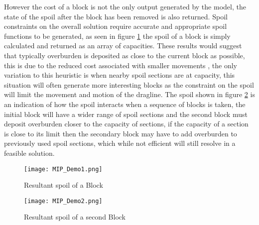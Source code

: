 However the cost of a block is not the only output generated by the model, the state of the spoil after the block has been removed is also returned. Spoil constraints on the overall solution require accurate and appropriate spoil functions to be generated, as seen in figure \ref{MIPDemo1} the spoil of a block is simply calculated and returned as an array of capacities. These results would suggest that typically overburden is deposited as close to the current block as possible, this is due to the reduced cost associated with smaller movements , the only variation to this heuristic is when nearby spoil sections are at capacity, this situation will often generate more interesting blocks  as the constraint on the spoil will limit the movement and motion of the dragline. The spoil shown in figure \ref{MIPDemo2} is an indication of how the spoil interacts when a sequence of blocks is taken, the initial block will have a wider range of spoil sections and the second block must deposit overburden closer to the capacity of sections, if the capacity of a section is close to its limit then the secondary block may have to add overburden to previously used spoil sections, which while not efficient will still resolve in a feasible solution. 

\begin{figure}[h]
\caption{Resultant spoil of a Block}
\label{MIPDemo1}
\texttt{[image: MIP\_Demo1.png]}
\end{figure}

\begin{figure}[h]
\caption{Resultant spoil of a second Block}
\label{MIPDemo2}
\texttt{[image: MIP\_Demo2.png]}
\end{figure}

